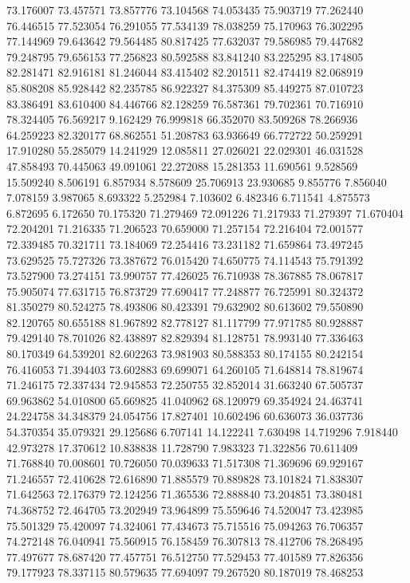 73.176007
73.457571
73.857776
73.104568
74.053435
75.903719
77.262440
76.446515
77.523054
76.291055
77.534139
78.038259
75.170963
76.302295
77.144969
79.643642
79.564485
80.817425
77.632037
79.586985
79.447682
79.248795
79.656153
77.256823
80.592588
83.841240
83.225295
83.174805
82.281471
82.916181
81.246044
83.415402
82.201511
82.474419
82.068919
85.808208
85.928442
82.235785
86.922327
84.375309
85.449275
87.010723
83.386491
83.610400
84.446766
82.128259
76.587361
79.702361
70.716910
78.324405
76.569217
9.162429
76.999818
66.352070
83.509268
78.266936
64.259223
82.320177
68.862551
51.208783
63.936649
66.772722
50.259291
17.910280
55.285079
14.241929
12.085811
27.026021
22.029301
46.031528
47.858493
70.445063
49.091061
22.272088
15.281353
11.690561
9.528569
15.509240
8.506191
6.857934
8.578609
25.706913
23.930685
9.855776
7.856040
7.078159
3.987065
8.693322
5.252984
7.103602
6.482346
6.711541
4.875573
6.872695
6.172650
70.175320
71.279469
72.091226
71.217933
71.279397
71.670404
72.204201
71.216335
71.206523
70.659000
71.257154
72.216404
72.001577
72.339485
70.321711
73.184069
72.254416
73.231182
71.659864
73.497245
73.629525
75.727326
73.387672
76.015420
74.650775
74.114543
75.791392
73.527900
73.274151
73.990757
77.426025
76.710938
78.367885
78.067817
75.905074
77.631715
76.873729
77.690417
77.248877
76.725991
80.324372
81.350279
80.524275
78.493806
80.423391
79.632902
80.613602
79.550890
82.120765
80.655188
81.967892
82.778127
81.117799
77.971785
80.928887
79.429140
78.701026
82.438897
82.829394
81.128751
78.993140
77.336463
80.170349
64.539201
82.602263
73.981903
80.588353
80.174155
80.242154
76.416053
71.394403
73.602883
69.699071
64.260105
71.648814
78.819674
71.246175
72.337434
72.945853
72.250755
32.852014
31.663240
67.505737
69.963862
54.010800
65.669825
41.040962
68.120979
69.354924
24.463741
24.224758
34.348379
24.054756
17.827401
10.602496
60.636073
36.037736
54.370354
35.079321
29.125686
6.707141
14.122241
7.630498
14.719296
7.918440
42.973278
17.370612
10.838838
11.728790
7.983323
71.322856
70.611409
71.768840
70.008601
70.726050
70.039633
71.517308
71.369696
69.929167
71.246557
72.410628
72.616890
71.885579
70.889828
73.101824
71.838307
71.642563
72.176379
72.124256
71.365536
72.888840
73.204851
73.380481
74.368752
72.464705
73.202949
73.964899
75.559646
74.520047
73.423985
75.501329
75.420097
74.324061
77.434673
75.715516
75.094263
76.706357
74.272148
76.040941
75.560915
76.158459
76.307813
78.412706
78.268495
77.497677
78.687420
77.457751
76.512750
77.529453
77.401589
77.826356
79.177923
78.337115
80.579635
77.694097
79.267520
80.187019
78.468253
